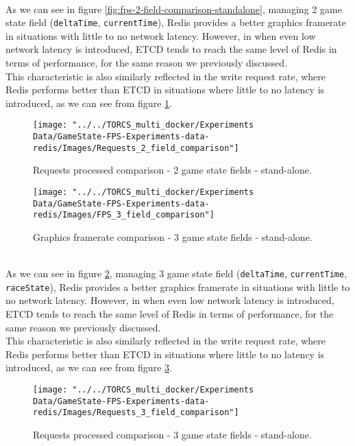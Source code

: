 \\ As we can see in figure \ref{fig:fps-2-field-comparison-standalone}, managing 2 game state field (\texttt{deltaTime}, \texttt{currentTime}), Redis provides a better graphics framerate in situations with little to no network latency. However, in when even low network latency is introduced, ETCD tends to reach the same level of Redis in terms of performance, for the same reason we previously discussed. \\
This characteristic is also similarly reflected in the write request rate, where Redis performs better than ETCD in situations where little to no latency is introduced, as we can see from figure \ref{fig:requests-2-field-comparison-standalone}.
\begin{figure}[h!]
	\centering
	\texttt{[image: "../../TORCS\_multi\_docker/Experiments Data/GameState-FPS-Experiments-data-redis/Images/Requests\_2\_field\_comparison"]}
	\caption[Requests processed comparison - 2 game state fields - stand-alone]{Requests processed comparison - 2 game state fields - stand-alone.}
	\label{fig:requests-2-field-comparison-standalone}
\end{figure}
\begin{figure}[h!]
	\centering
	\texttt{[image: "../../TORCS\_multi\_docker/Experiments Data/GameState-FPS-Experiments-data-redis/Images/FPS\_3\_field\_comparison"]}
	\caption[Graphics framerate comparison - 3 game state fields - stand-alone]{Graphics framerate comparison - 3 game state fields - stand-alone.}
	\label{fig:fps-3-field-comparison-standalone}
\end{figure}
\\ As we can see in figure \ref{fig:fps-3-field-comparison-standalone}, managing 3 game state field (\texttt{deltaTime}, \texttt{currentTime}, \texttt{raceState}), Redis provides a better graphics framerate in situations with little to no network latency. However, in when even low network latency is introduced, ETCD tends to reach the same level of Redis in terms of performance, for the same reason we previously discussed. \\
This characteristic is also similarly reflected in the write request rate, where Redis performs better than ETCD in situations where little to no latency is introduced, as we can see from figure \ref{fig:requests-3-field-comparison-standalone}.
\begin{figure}[h!]
	\centering
	\texttt{[image: "../../TORCS\_multi\_docker/Experiments Data/GameState-FPS-Experiments-data-redis/Images/Requests\_3\_field\_comparison"]}
	\caption[Requests processed comparison - 3 game state fields - stand-alone]{Requests processed comparison - 3 game state fields - stand-alone.}
	\label{fig:requests-3-field-comparison-standalone}
\end{figure}
